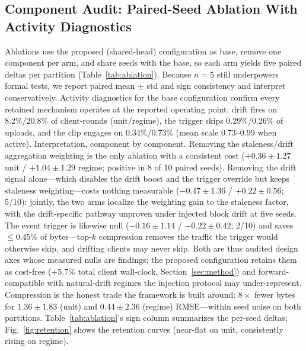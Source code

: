 \documentclass[journal]{IEEEtran}
\begin{document}
\subsection{Component Audit: Paired-Seed Ablation With Activity Diagnostics}\label{sec:audit}
Ablations use the proposed (shared-head) configuration as base, remove one component per arm, and share seeds with the base, so each arm yields five paired deltas per partition (Table~\ref{tab:ablation}). Because $n = 5$ still underpowers formal tests, we report paired mean $\pm$ std and sign consistency and interpret conservatively. Activity diagnostics for the base configuration confirm every retained mechanism operates at the reported operating point: drift fires on 8.2\%/20.8\% of client-rounds (unit/regime), the trigger skips 0.29\%/0.26\% of uploads, and the clip engages on 0.34\%/0.73\% (mean scale 0.73--0.99 when active). Interpretation, component by component. Removing the staleness/drift aggregation weighting is the only ablation with a consistent cost ($+0.36 \pm 1.27$ unit / $+1.04 \pm 1.29$ regime; positive in 8 of 10 paired seeds). Removing the drift signal alone---which disables the drift boost and the trigger override but keeps staleness weighting---costs nothing measurable ($-0.47 \pm 1.36$ / $+0.22 \pm 0.56$; 5/10): jointly, the two arms localize the weighting gain to the staleness factor, with the drift-specific pathway unproven under injected block drift at five seeds. The event trigger is likewise null ($-0.16 \pm 1.14$ / $-0.22 \pm 0.42$; 2/10) and saves $\leq 0.45\%$ of bytes---top-$k$ compression removes the traffic the trigger would otherwise skip, and drifting clients may never skip. Both are thus audited design axes whose measured nulls are findings; the proposed configuration retains them as cost-free ($+5.7\%$ total client wall-clock, Section~\ref{sec:method}) and forward-compatible with natural-drift regimes the injection protocol may under-represent. Compression is the honest trade the framework is built around: $8\times$ fewer bytes for $1.36 \pm 1.83$ (unit) and $0.44 \pm 2.36$ (regime) RMSE---within seed noise on both partitions. Table~\ref{tab:ablation}'s sign column summarizes the per-seed deltas; Fig.~\ref{fig:retention} shows the retention curves (near-flat on unit, consistently rising on regime).
\end{document}
